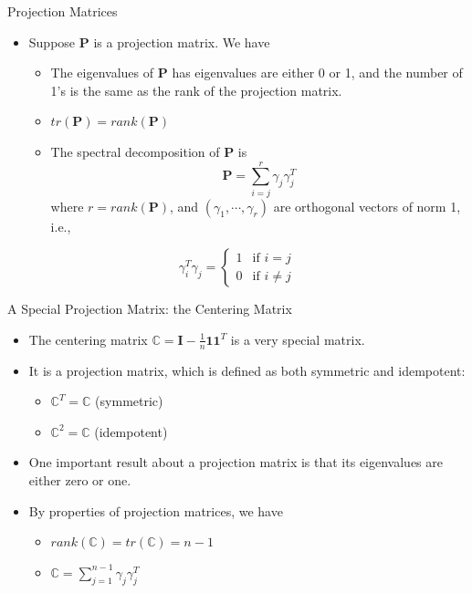 \documentclass[
  ignorenonframetext,
]{beamer}
\providecommand{\tightlist}{%
  \setlength{\itemsep}{0pt}\setlength{\parskip}{0pt}}
\begin{document}
\begin{frame}{Projection Matrices}
\protect\hypertarget{projection-matrices-1}{}
\begin{itemize}
\tightlist
\item
  Suppose \(\mathbf P\) is a projection matrix. We have

  \begin{itemize}
  \tightlist
  \item
    The eigenvalues of \(\mathbf{P}\) has eigenvalues are either 0 or 1,
    and the number of 1's is the same as the rank of the projection
    matrix.
  \item
    \(tr(\mathbf P) = rank(\mathbf P)\)
  \item
    The spectral decomposition of \(\mathbf P\) is
    \[\mathbf P=\sum_{i=j}^r \gamma_j\gamma_j^T\] where
    \(r=rank(\mathbf P)\), and \((\gamma_1, \cdots, \gamma_r)\) are
    orthogonal vectors of norm 1, i.e.,
  \end{itemize}
\end{itemize}

\[
\gamma_i^T\gamma_j = \left\{
    \begin{array}{ll}
    1 & \mbox{if } i=j\\
    0 & \mbox{if } i\not=j    
    \end{array}
\right.
\]
\end{frame}

\begin{frame}{A Special Projection Matrix: the Centering Matrix}
\protect\hypertarget{a-special-projection-matrix-the-centering-matrix}{}
\begin{itemize}
\tightlist
\item
  The centering matrix
  \(\mathbb C=\mathbf I - \frac{1}{n} \mathbf 1\mathbf 1^T\) is a very
  special matrix.
\item
  It is a projection matrix, which is defined as both symmetric and
  idempotent:

  \begin{itemize}
  \tightlist
  \item
    \(\mathbb C^T=\mathbb C\) (symmetric)
  \item
    \(\mathbb C^2= \mathbb C\) (idempotent)
  \end{itemize}
\item
  One important result about a projection matrix is that its eigenvalues
  are either zero or one.
\item
  By properties of projection matrices, we have

  \begin{itemize}
  \tightlist
  \item
    \(rank(\mathbb C) = tr(\mathbb C)=n-1\)
  \item
    \(\mathbb C = \sum_{j=1}^{n-1}\gamma_j\gamma_j^T\)
  \end{itemize}
\end{itemize}
\end{frame}
\end{document}
